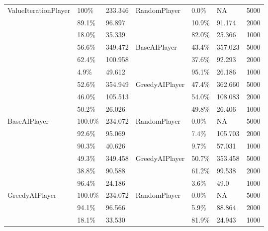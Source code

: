 \documentclass{article}
\begin{document}
\begin{longtable}{|p{3cm}|p{1cm}|p{1.3cm}|p{2.5cm}|p{1cm}|p{1.3cm}|p{1.2cm}|}
        \multirow{9}{*}{ValueIterationPlayer} & 100\% & 233.346 & \multirow{3}{*}{RandomPlayer} & 0.0\% & NA  & 5000 \\
        \cline{2-3} \cline{5-7}
        & 89.1\% & 96.897 &  & 10.9\% & 91.174 & 2000 \\
        \cline{2-3} \cline{5-7}
        & 18.0\% & 35.339 &  & 82.0\% & 25.366 & 1000 \\
        \cline{2-7}
        & 56.6\% & 349.472 & \multirow{3}{*}{BaseAIPlayer} & 43.4\% & 357.023 & 5000 \\
        \cline{2-3} \cline{5-7}
        & 62.4\% & 100.958 &  & 37.6\% & 92.293 & 2000 \\
        \cline{2-3} \cline{5-7}
        & 4.9\% & 49.612 &  & 95.1\% & 26.186 & 1000 \\
        \cline{2-7}
        & 52.6\% & 354.949 & \multirow{3}{*}{GreedyAIPlayer} & 47.4\% & 362.660 & 5000 \\
        \cline{2-3} \cline{5-7}
        & 46.0\% & 105.513 &  & 54.0\% & 108.083 & 2000 \\
        \cline{2-3} \cline{5-7}
        & 50.2\% & 26.026 &  & 49.8\% & 26.406 & 1000 \\
        \hline
        \multirow{6}{*}{BaseAIPlayer} & 100.0\% & 234.072 & \multirow{3}{*}{RandomPlayer} & 0.0\% & NA & 5000 \\
        \cline{2-3} \cline{5-7}
        & 92.6\% & 95.069 &  & 7.4\% & 105.703 & 2000 \\
        \cline{2-3} \cline{5-7}
        & 90.3\% & 40.626 &  & 9.7\% & 57.031 & 1000 \\
        \cline{2-7}
        & 49.3\% & 349.458 & \multirow{3}{*}{GreedyAIPlayer} & 50.7\% & 353.458 & 5000 \\
        \cline{2-3} \cline{5-7}
        & 38.8\% & 90.588 &  & 61.2\% & 99.538 & 2000 \\
        \cline{2-3} \cline{5-7}
        & 96.4\% & 24.186 &  & 3.6\% & 49.0 & 1000 \\
        \hline
        \multirow{3}{*}{GreedyAIPlayer} & 100.0\% & 234.072 & \multirow{3}{*}{RandomPlayer} & 0.0\% & NA & 5000 \\
        \cline{2-3} \cline{5-7}
        & 94.1\% & 96.566 &  & 5.9\% & 88.864 & 2000 \\
        \cline{2-3} \cline{5-7}
        & 18.1\% & 33.530 &  & 81.9\% & 24.943 & 1000 \\

    \end{longtable}
\end{document}
